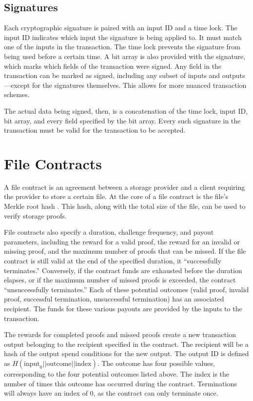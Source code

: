 \documentclass[twocolumn]{article}
\begin{document}
\subsection{Signatures}
Each cryptographic signature is paired with an input ID and a time lock. 
The input ID indicates which input the signature is being applied to.
It must match one of the inputs in the transaction.
The time lock prevents the signature from being used before a certain time.
A bit array is also provided with the signature, which marks which fields of the transaction were signed.
Any field in the transaction can be marked as signed, including any subset of inputs and outputs---except for the signatures themselves.
This allows for more nuanced transaction schemes.

The actual data being signed, then, is a concatenation of the time lock, input ID, bit array, and every field specified by the bit array.
Every such signature in the transaction must be valid for the transaction to be accepted.

\section{File Contracts}
\label{sec:contracts}
A file contract is an agreement between a storage provider and a client requiring the provider to store a certain file.
At the core of a file contract is the file's Merkle root hash \cite{merkle}.
This hash, along with the total size of the file, can be used to verify storage proofs.

File contracts also specify a duration, challenge frequency, and payout parameters, including the reward for a valid proof, the reward for an invalid or missing proof, and the maximum number of proofs that can be missed.
If the file contract is still valid at the end of the specified duration, it ``successfully terminates.''
Conversely, if the contract funds are exhausted before the duration elapses, or if the maximum number of missed proofs is exceeded, the contract ``unsuccessfully terminates.''
Each of these potential outcomes (valid proof, invalid proof, successful termination, unsuccessful termination) has an associated recipient.
The funds for these various payouts are provided by the inputs to the transaction.

The rewards for completed proofs and missed proofs create a new transaction output belonging to the recipient specified in the contract.
The recipient will be a hash of the output spend conditions for the new output.
The output ID is defined as $H(\text{input}_0 || \text{outcome} || \text{index})$.
The outcome has four possible values, corresponding to the four potential outcomes listed above.
The index is the number of times this outcome has occurred during the contract.
Terminations will always have an index of 0, as the contract can only terminate once.
\end{document}
